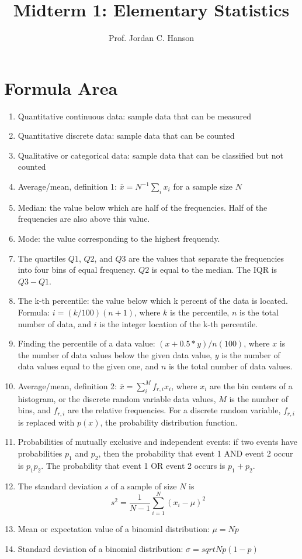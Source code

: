 \documentclass{article}
\begin{document}
\title{Midterm 1: Elementary Statistics}
\author{Prof. Jordan C. Hanson}

\maketitle

\section{Formula Area}

\begin{enumerate}
\item Quantitative continuous data: sample data that can be measured
\item Quantitative discrete data: sample data that can be counted
\item Qualitative or categorical data: sample data that can be classified but not counted
\item Average/mean, definition 1: $\bar{x} = N^{-1} \sum_i x_i$ for a sample size $N$
\item Median: the value below which are half of the frequencies.  Half of the frequencies are also above this value.
\item Mode: the value corresponding to the highest frequendy.
\item The quartiles $Q1$, $Q2$, and $Q3$ are the values that separate the frequencies into four bins of equal frequency. $Q2$ is equal to the median.  The IQR is $Q3 - Q1$.
\item The k-th percentile: the value below which k percent of the data is located.  Formula: $i = (k/100) (n+1)$, where $k$ is the percentile, $n$ is the total number of data, and $i$ is the integer location of the k-th percentile.
\item Finding the percentile of a data value: $(x+0.5*y)/n (100)$, where $x$ is the number of data values below the given data value, $y$ is the number of data values equal to the given one, and $n$ is the total number of data values.
\item Average/mean, definition 2: $\bar{x} = \sum_i^{M} f_{r,i} x_i$, where $x_i$ are the bin centers of a histogram, or the discrete random variable data values, $M$ is the number of bins, and $f_{r,i}$ are the relative frequencies.  For a discrete random variable, $f_{r,i}$ is replaced with $p(x)$, the probability distribution function.
\item Probabilities of mutually exclusive and independent events: if two events have probabilities $p_1$ and $p_2$, then the probability that event 1 AND event 2 occur is $p_1 p_2$.  The probability that event 1 OR event 2 occurs is $p_1 + p_2$.
\item The standard deviation $s$ of a sample of size $N$ is 
\begin{equation}
s^2 = \frac{1}{N-1}\sum_{i=1}^N (x_i-\mu)^2
\end{equation}
\item Mean or expectation value of a binomial distribution: $\mu = Np$
\item Standard deviation of a binomial distribution: $\sigma = sqrt{N p (1-p)}$
\end{enumerate}
\end{document}
